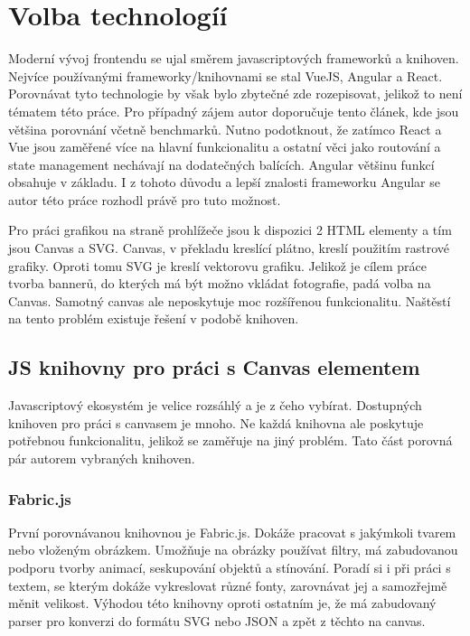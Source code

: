     \section{Volba technologíí}
    Moderní vývoj frontendu se ujal směrem javascriptových frameworků a knihoven. Nejvíce používanými frameworky/knihovnami se stal VueJS, Angular a React.
    Porovnávat tyto technologie by však bylo zbytečné zde rozepisovat, jelikož to není tématem této práce.
    Pro případný zájem autor doporučuje tento článek, kde jsou většina porovnání včetně benchmarků.
    Nutno podotknout, že zatímco React a Vue jsou zaměřené více na hlavní funkcionalitu a ostatní věci jako routování a state management nechávají
    na dodatečných balících. Angular většinu funkcí obsahuje v základu.
    I z tohoto důvodu a lepší znalosti frameworku Angular se autor této práce rozhodl právě pro tuto možnost. 

    Pro práci grafikou na straně prohlížeče jsou k dispozici 2 HTML elementy a tím jsou Canvas a SVG.
    Canvas, v překladu kreslící plátno, kreslí použitím rastrové grafiky. Oproti tomu SVG je kreslí vektorovu grafiku.
    Jelikož je cílem práce tvorba bannerů, do kterých má být možno vkládat fotografie, padá volba na Canvas.
    Samotný canvas ale neposkytuje moc rozšířenou funkcionalitu. Naštěstí na tento problém existuje řešení v podobě knihoven.

        \subsection{JS knihovny pro práci s Canvas elementem}
        Javascriptový ekosystém je velice rozsáhlý a je z čeho vybírat. Dostupných knihoven pro práci s canvasem je mnoho.
        Ne každá knihovna ale poskytuje potřebnou funkcionalitu,
        jelikož se zaměřuje na jiný problém. Tato část porovná pár autorem vybraných knihoven.

            \subsubsection{Fabric.js}
            První porovnávanou knihovnou je Fabric.js. Dokáže pracovat s jakýmkoli tvarem nebo vloženým obrázkem. Umožňuje na obrázky používat filtry,
            má zabudovanou podporu tvorby animací, seskupování objektů a stínování. Poradí si i při práci s textem, se kterým dokáže vykreslovat různé fonty,
            zarovnávat jej a samozřejmě měnit velikost.
            Výhodou této knihovny oproti ostatním je, že má zabudovaný parser pro konverzi do formátu SVG nebo JSON a zpět z těchto na canvas.  
            
